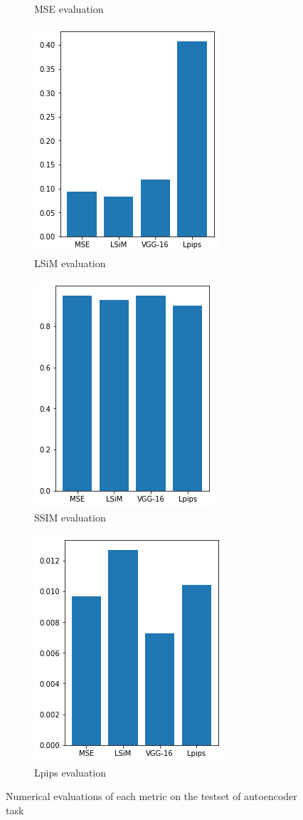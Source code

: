 \documentclass[a4paper,12pt,twoside]{report}
\begin{document}
\begin{figure}
\begin{subfigure}{0.32\textwidth}
		\caption{MSE evaluation}
	\end{subfigure}
	\begin{subfigure}{0.32\textwidth}
		\centering
		\includegraphics[scale=0.5]{autoencoder/lsimeval.png}
		\caption{LSiM evaluation}
	\end{subfigure}
	\begin{subfigure}{0.32\textwidth}
		\centering
		\includegraphics[scale=0.5]{autoencoder/ssimeval.png}
		\caption{SSIM evaluation}
	\end{subfigure}
	\begin{subfigure}{0.32\textwidth}
		\centering
		\includegraphics[scale=0.5]{autoencoder/lpipseval.png}
		\caption{Lpips evaluation}
	\end{subfigure}
	\caption{Numerical evaluations of each metric on the testset of autoencoder task}
	\label{autoencoder numeval}
\end{figure}
\end{document}
